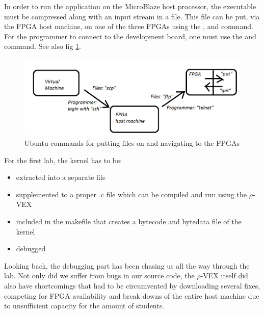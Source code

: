 In order to run the application on the MicroBlaze host processor, the  executable must be compressed along with an input stream in a  file. This file can be put, via the FPGA host machine, on one of the three FPGAs using the ,  and  command. For the programmer to connect to the development board, one must use the  and  command. See also fig \ref{fig:hoppen}.

\begin{figure}[htb]%
\includegraphics[width=\columnwidth]{Pictures/hop}%
\caption{Ubuntu commands for putting files on and navigating to the FPGAs}%
\label{fig:hoppen}%
\end{figure}

For the first lab, the  kernel has to be:
\begin{itemize}
	\item extracted into a separate file
	\item supplemented to a proper .c file which can be compiled and run using the $\rho$-VEX
	\item included in the makefile that creates a bytecode and bytedata file of the kernel
	\item debugged
\end{itemize}

Looking back, the debugging part has been chasing us all the way through the lab. Not only did we suffer from bugs in our source code, the $\rho$-VEX itself did also have shortcomings that had to be circumvented by downloading several fixes, competing for FPGA availability and break downs of the entire host machine due to unsufficient capacity for the amount of students.


